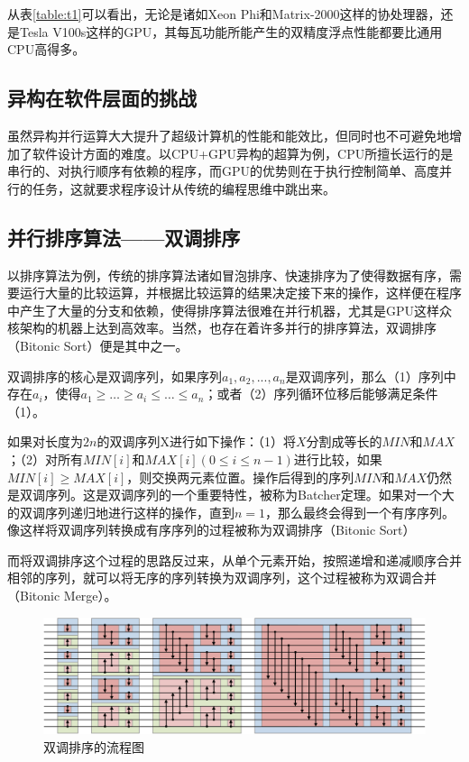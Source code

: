 \documentclass[UTF8,a4paper,10pt]{ctexart}
\begin{document}
从表\ref{table:t1}可以看出，无论是诸如Xeon Phi和Matrix-2000这样的协处理器，还是Tesla V100s这样的GPU，其每瓦功能所能产生的双精度浮点性能都要比通用CPU高得多。

\subsection{异构在软件层面的挑战}
虽然异构并行运算大大提升了超级计算机的性能和能效比，但同时也不可避免地增加了软件设计方面的难度。以CPU+GPU异构的超算为例，CPU所擅长运行的是串行的、对执行顺序有依赖的程序，而GPU的优势则在于执行控制简单、高度并行的任务，这就要求程序设计从传统的编程思维中跳出来。\cite{supercom_energy_prog}

\subsection{并行排序算法——双调排序}
以排序算法为例，传统的排序算法诸如冒泡排序、快速排序为了使得数据有序，需要运行大量的比较运算，并根据比较运算的结果决定接下来的操作，这样便在程序中产生了大量的分支和依赖，使得排序算法很难在并行机器，尤其是GPU这样众核架构的机器上达到高效率。当然，也存在着许多并行的排序算法，双调排序（Bitonic Sort）便是其中之一。

双调排序的核心是双调序列，如果序列$a_{1},a_{2},...,a_{n}$是双调序列，那么（1）序列中存在$a_{i}$，使得$a_{1}\ge …\ge a_{i}\le …\le a_{n}$；或者（2）序列循环位移后能够满足条件（1）。

如果对长度为$2n$的双调序列X进行如下操作：（1）将$X$分割成等长的$MIN和MAX$；（2）对所有$MIN[i]$和$MAX[i] (0\le i\le n-1)$进行比较，如果$MIN[i]\ge MAX[i]$，则交换两元素位置。操作后得到的序列$MIN$和$MAX$仍然是双调序列。这是双调序列的一个重要特性，被称为Batcher定理。如果对一个大的双调序列递归地进行这样的操作，直到$n=1$，那么最终会得到一个有序序列。像这样将双调序列转换成有序序列的过程被称为双调排序（Bitonic Sort）

而将双调排序这个过程的思路反过来，从单个元素开始，按照递增和递减顺序合并相邻的序列，就可以将无序的序列转换为双调序列，这个过程被称为双调合并（Bitonic Merge）。\cite{bitonic_jianshu}

\begin{figure}[!htbp]
    \centering
    \includegraphics[width=5in]{fig/1280px-BitonicSort1.svg.png}
    \caption{双调排序的流程图\cite{bitonic_wiki}}
    \label{fig:bitonic}
\end{figure}
\end{document}
